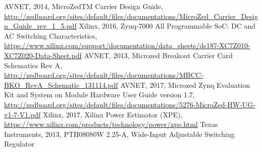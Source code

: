 \begin{thebibliography}{21} %
    AVNET, 2014, MicroZedTM Carrier Design Guide, \url{http://zedboard.org/sites/default/files/documentations/MicroZed_Carrier_Design_Guide_rev_1_5.pdf}
  	Xilinx, 2016, Zynq-7000 All Programmable SoC: DC and AC Switching Characteristics, \url{https://www.xilinx.com/support/documentation/data_sheets/ds187-XC7Z010-XC7Z020-Data-Sheet.pdf}
  	AVNET, 2013, Microzed Breakout Carrier Card Schematics Rev A, \url{http://zedboard.org/sites/default/files/documentations/MBCC-BKO_RevA_Schematic_131114.pdf}
  	AVNET, 2017, Microzed Zynq Evaluation Kit and System on Module Hardware User Guide version 1.7, \url{http://zedboard.org/sites/default/files/documentations/5276-MicroZed-HW-UG-v1-7-V1.pdf}
  	Xilinx, 2017, Xilinx Power Estimator (XPE), \url{https://www.xilinx.com/products/technology/power/xpe.html}
  	Texas Instruments, 2013, PTH08080W 2.25-A, Wide-Input Adjustable Switching Regulator
\end{thebibliography}
